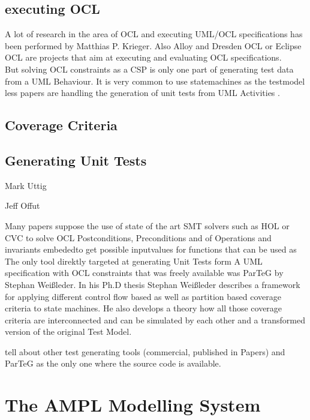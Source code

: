 \subsection{executing OCL}
A lot of research in the area of OCL and executing UML/OCL specifications has been performed by Matthias P. Krieger\cite{krieger2008executing}. Also Alloy and Dresden OCL or Eclipse OCL are projects that aim at executing and evaluating OCL specifications. 
\\
But solving OCL constraints as a CSP is only one part of generating test data from a UML Behaviour.
It is very common to use statemachines as the testmodel less papers are handling the generation of unit tests from UML Activities\cite{Linzhang04GeneratingTestCasefromActivityGrayBoxMethod}
\cite{Patel12TestCaseFormationUsigUMLActivityDiagram}
\cite{Pechtanun12GeneratingTestCaseFromUMLActivityDiagramBasedOnACGrammar}
\cite{Xu09ModelCheckingUMLActivities}\cite{Xu09ModelCheckingUMLActivityDiagramsFDR}. 


\subsection{Coverage Criteria}


\subsection{Generating Unit Tests}
Mark Uttig

Jeff Offut

Many papers suppose the use of state of the art SMT solvers such as HOL or CVC to solve OCL Postconditions, Preconditions and  of Operations and invariants embededto get possible inputvalues for functions that can be used as 
The only tool direktly targeted at generating Unit Tests form A UML specification with OCL constraints that was freely available was ParTeG by Stephan Weißleder. In his Ph.D thesis Stephan Weißleder describes a framework for applying different control flow based as well as partition based coverage criteria to state machines. He also develops a theory how all those coverage criteria are interconnected and can be simulated by each other and a transformed version of the original Test Model\cite{ParTeG}.


tell about other test generating tools (commercial, published in Papers) and ParTeG as the only one where the source code is available.\cite{ParTeG}

\section{The AMPL Modelling System}
\label{sec:AMPL}
\cite{AMPL}
